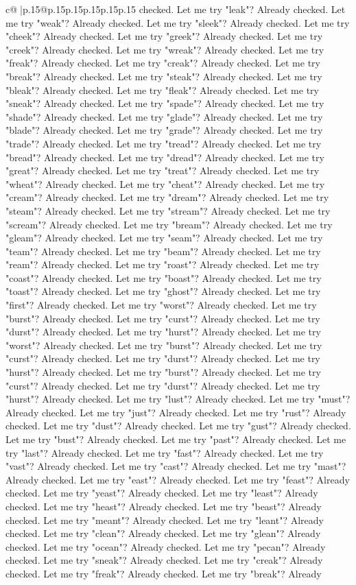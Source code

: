\documentclass{article}
\begin{document}
{\begin{supertabular}{c@{$\;$}|p{.15\linewidth}@{}p{.15\linewidth}p{.15\linewidth}p{.15\linewidth}p{.15\linewidth}p{.15\linewidth}}
{{{checked. Let me try "leak"? Already checked. Let me try "weak"? Already checked. Let me try "sleek"? Already checked. Let me try "cheek"? Already checked. Let me try "greek"? Already checked. Let me try "creek"? Already checked. Let me try "wreak"? Already checked. Let me try "freak"? Already checked. Let me try "creak"? Already checked. Let me try "break"? Already checked. Let me try "steak"? Already checked. Let me try "bleak"? Already checked. Let me try "fleak"? Already checked. Let me try "sneak"? Already checked. Let me try "spade"? Already checked. Let me try "shade"? Already checked. Let me try "glade"? Already checked. Let me try "blade"? Already checked. Let me try "grade"? Already checked. Let me try "trade"? Already checked. Let me try "tread"? Already checked. Let me try "bread"? Already checked. Let me try "dread"? Already checked. Let me try "great"? Already checked. Let me try "treat"? Already checked. Let me try "wheat"? Already checked. Let me try "cheat"? Already checked. Let me try "cream"? Already checked. Let me try "dream"? Already checked. Let me try "steam"? Already checked. Let me try "stream"? Already checked. Let me try "scream"? Already checked. Let me try "bream"? Already checked. Let me try "gleam"? Already checked. Let me try "seam"? Already checked. Let me try "team"? Already checked. Let me try "beam"? Already checked. Let me try "ream"? Already checked. Let me try "roast"? Already checked. Let me try "coast"? Already checked. Let me try "boast"? Already checked. Let me try "toast"? Already checked. Let me try "ghost"? Already checked. Let me try "first"? Already checked. Let me try "worst"? Already checked. Let me try "burst"? Already checked. Let me try "curst"? Already checked. Let me try "durst"? Already checked. Let me try "hurst"? Already checked. Let me try "worst"? Already checked. Let me try "burst"? Already checked. Let me try "curst"? Already checked. Let me try "durst"? Already checked. Let me try "hurst"? Already checked. Let me try "burst"? Already checked. Let me try "curst"? Already checked. Let me try "durst"? Already checked. Let me try "hurst"? Already checked. Let me try "lust"? Already checked. Let me try "must"? Already checked. Let me try "just"? Already checked. Let me try "rust"? Already checked. Let me try "dust"? Already checked. Let me try "gust"? Already checked. Let me try "bust"? Already checked. Let me try "past"? Already checked. Let me try "last"? Already checked. Let me try "fast"? Already checked. Let me try "vast"? Already checked. Let me try "cast"? Already checked. Let me try "mast"? Already checked. Let me try "east"? Already checked. Let me try "feast"? Already checked. Let me try "yeast"? Already checked. Let me try "least"? Already checked. Let me try "heast"? Already checked. Let me try "beast"? Already checked. Let me try "meant"? Already checked. Let me try "leant"? Already checked. Let me try "clean"? Already checked. Let me try "glean"? Already checked. Let me try "ocean"? Already checked. Let me try "pecan"? Already checked. Let me try "sneak"? Already checked. Let me try "creak"? Already checked. Let me try "freak"? Already checked. Let me try "break"? Already }}}
\end{supertabular}}
\end{document}
